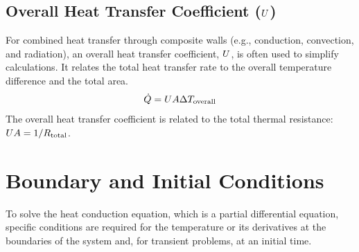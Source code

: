 \subsection{Overall Heat Transfer Coefficient ($U$)}
For combined heat transfer through composite walls (e.g., conduction, convection, and radiation), an overall heat transfer coefficient, $U$, is often used to simplify calculations. It relates the total heat transfer rate to the overall temperature difference and the total area.
\begin{equation*}
    \dot{Q} = U A \Delta T_{\text{overall}}
\end{equation*}
The overall heat transfer coefficient is related to the total thermal resistance: $U A = 1/R_{\text{total}}$.

\section{Boundary and Initial Conditions}
To solve the heat conduction equation, which is a partial differential equation, specific conditions are required for the temperature or its derivatives at the boundaries of the system and, for transient problems, at an initial time.

